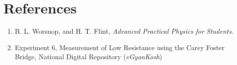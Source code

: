 \section*{References}

\begin{enumerate}
\item B. L. Worsnop, and H. T. Flint, \textit{Advanced Practical Physics for Students}.
\item Experiment 6, Measurement of Low Resistance using the Carey Foster Bridge, National Digital Repository (\textit{eGyanKosh})
\end{enumerate}


\newpage